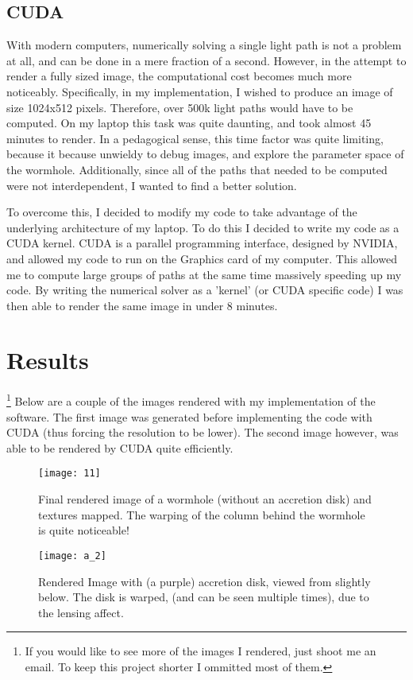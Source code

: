 \documentclass{article}
\begin{document}
\subsection{CUDA}
  With modern computers, numerically solving a single light path is not a problem at all, and can be done in a mere fraction of a second. However, in the attempt to render a fully sized image, the computational cost becomes much more noticeably. Specifically, in my implementation, I wished to produce an image of size 1024x512 pixels. Therefore, over 500k light paths would have to be computed. On my laptop this task was quite daunting, and took almost 45 minutes to render. In a pedagogical sense, this time factor was quite limiting, because it because unwieldy to debug images, and explore the parameter space of the wormhole. Additionally, since all of the paths that needed to be computed were not interdependent, I wanted to find a better solution. \par
  To overcome this, I decided to modify my code to take advantage of the underlying architecture of my laptop. To do this I decided to write my code as a CUDA kernel. CUDA is a parallel programming interface, designed by NVIDIA, and allowed my code to run on the Graphics card of my computer. This allowed me to compute large groups of paths at the same time massively speeding up my code. By writing the numerical solver as a 'kernel' (or CUDA specific code) I was then able to render the same image in under 8 minutes. \par
\section{Results}\footnote{If you would like to see more of the images I rendered, just shoot me an email. To keep this project shorter I ommitted most of them.}
  Below are a couple of the images rendered with my implementation of the software. The first image was generated before implementing the code with CUDA (thus forcing the resolution to be lower). The second image however, was able to be rendered by CUDA quite efficiently. 
\begin{figure}[H]
  \centering
  \texttt{[image: 11]}
  \caption{Final rendered image of a wormhole (without an accretion disk) and textures mapped. The warping of the column behind the wormhole is quite noticeable!}
  \label{fig:mine}
\end{figure}

\begin{figure}[H]
  \centering
  \texttt{[image: a\_2]}
  \caption{Rendered Image with (a purple) accretion disk, viewed from slightly below. The disk is warped, (and can be seen multiple times), due to the lensing affect.}
  \label{fig:mine}
\end{figure}
\end{document}

